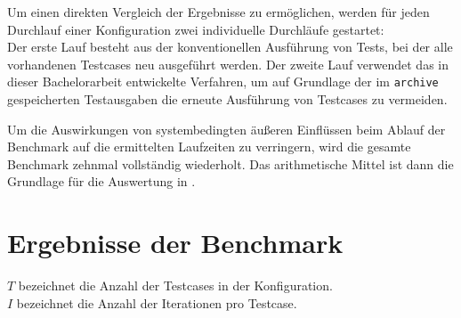 Um einen direkten Vergleich der Ergebnisse zu ermöglichen, werden für jeden Durchlauf einer Konfiguration zwei individuelle Durchläufe gestartet:\\
Der erste Lauf besteht aus der konventionellen Ausführung von Tests, bei der alle vorhandenen Testcases neu ausgeführt werden. Der zweite Lauf verwendet das in dieser Bachelorarbeit entwickelte Verfahren, um auf Grundlage der im \texttt{archive} gespeicherten Testausgaben die erneute Ausführung von Testcases zu vermeiden.

Um die Auswirkungen von systembedingten äußeren Einflüssen beim Ablauf der Benchmark auf die ermittelten Laufzeiten zu verringern, wird die gesamte Benchmark zehnmal vollständig wiederholt. Das arithmetische Mittel ist dann die Grundlage für die Auswertung in . 

\newpage
\section{Ergebnisse der Benchmark}\label{chap:result_benchmark}
$T$ bezeichnet die Anzahl der Testcases in der Konfiguration.\\
$I$ bezeichnet die Anzahl der Iterationen pro Testcase.


